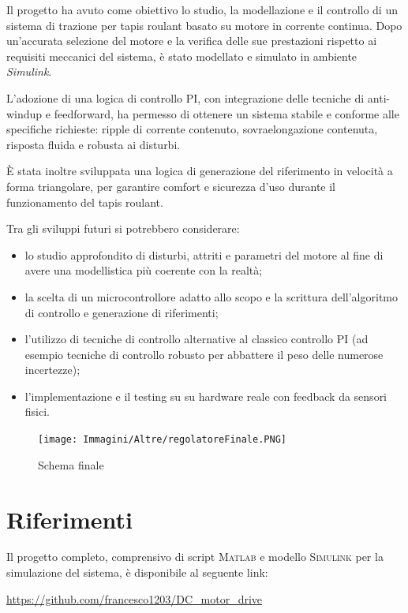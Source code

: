 \documentclass[a4paper,12pt]{article}
\begin{document}
Il progetto ha avuto come obiettivo lo studio, la modellazione e il controllo di un sistema di trazione per tapis roulant basato su motore in corrente continua. Dopo un’accurata selezione del motore e la verifica delle sue prestazioni rispetto ai requisiti meccanici del sistema, è stato modellato e simulato in ambiente \textit{Simulink}.

L'adozione di una logica di controllo PI, con integrazione delle tecniche di anti-windup e feedforward, ha permesso di ottenere un sistema stabile e conforme alle specifiche richieste: ripple di corrente contenuto, sovraelongazione contenuta, risposta fluida e robusta ai disturbi.

È stata inoltre sviluppata una logica di generazione del riferimento in velocità a forma triangolare, per garantire comfort e sicurezza d'uso durante il funzionamento del tapis roulant.

\bigskip

Tra gli sviluppi futuri si potrebbero considerare:

\begin{itemize}
    \item lo studio approfondito di disturbi, attriti e parametri del motore al fine di avere una modellistica più coerente con la realtà;
    \item la scelta di un microcontrollore adatto allo scopo e la scrittura dell'algoritmo di controllo e generazione di riferimenti; 
    \item l'utilizzo di tecniche di controllo alternative al classico controllo PI (ad esempio tecniche di controllo robusto per abbattere il peso delle numerose incertezze);
    \item l’implementazione e il testing su su hardware reale con feedback da sensori fisici.
\end{itemize}

\bigskip


\begin{figure}[h!]
    \centering
    \texttt{[image: Immagini/Altre/regolatoreFinale.PNG]}
    \caption{Schema finale}
    \label{fig: modelloFinale}
\end{figure}

\vspace{0.5cm}


\newpage

\section*{Riferimenti}

Il progetto completo, comprensivo di script \textsc{Matlab} e modello \textsc{Simulink} per la simulazione del sistema, è disponibile al seguente link:

\vspace{0.5cm}

\url{https://github.com/francesco1203/DC_motor_drive}
\end{document}
